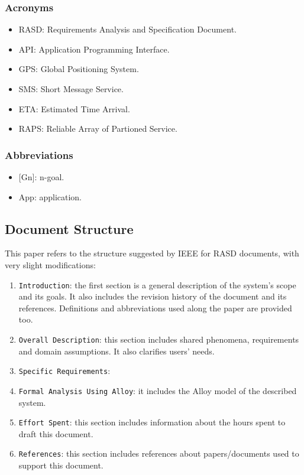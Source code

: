 \documentclass[12pt,a4paper]{article}
\begin{document}
			\subsubsection{Acronyms}
				\begin{itemize}
				\item RASD: Requirements Analysis and Specification Document.
				\item API: Application Programming Interface.
				\item GPS: Global Positioning System.
				\item SMS: Short Message Service. 
				\item ETA: Estimated Time Arrival.
				\item RAPS: Reliable Array of Partioned Service.
				\end{itemize}
			\subsubsection{Abbreviations}
				\begin{itemize}
				\item {[}Gn{]}: n-goal.
				\item {App}: application.
				\end{itemize}
		
		\subsection{Document Structure}
			This paper refers to the structure suggested by IEEE for RASD documents, with very slight modifications:
			\begin{enumerate}
				\item \texttt{Introduction}: the first section is a general description of the system's scope and its goals. It also includes the revision history of the document and its references. Definitions and abbreviations used along the paper are provided too.
				\item \texttt{Overall Description}: this section includes shared phenomena, requirements and domain assumptions. It also clarifies users' needs.
				\item \texttt{Specific Requirements}: 
				\item \texttt{Formal Analysis Using Alloy}: it includes the Alloy model of the described system.
				\item \texttt{Effort Spent}: this section includes information about the hours spent to draft this document. 
				\item \texttt{References}: this section includes references about papers/documents used to support this document.
			\end{enumerate}
		
\end{document}
